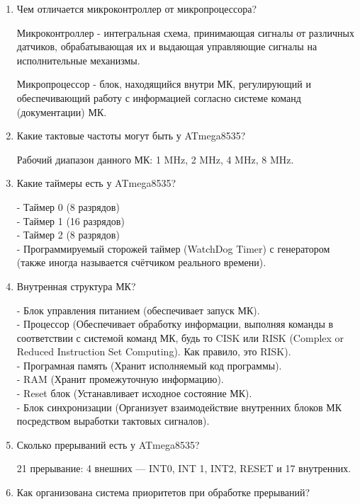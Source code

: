 \documentclass{lab}
\begin{document}

\begin{enumerate}
	\item Чем отличается микроконтроллер от микропроцессора?
	
	Микроконтроллер - интегральная схема, принимающая сигналы от различных датчиков, обрабатывающая их и выдающая управляющие сигналы на исполнительные механизмы.
	
	Микропроцессор - блок, находящийся внутри МК, регулирующий и обеспечивающий работу с информацией согласно системе команд (документации) МК.
	
	\item Какие тактовые частоты могут быть у ATmega8535?
	
	Рабочий диапазон данного МК: 1 MHz, 2 MHz, 4 MHz, 8 MHz.
	
	\item Какие таймеры есть у ATmega8535?
	
	- Таймер 0 (8 разрядов)\\
	- Таймер 1 (16 разрядов)\\
	- Таймер 2 (8 разрядов)\\
	- Программируемый сторожей таймер (WatchDog Timer) с генератором (также иногда называется счётчиком реального времени).
	\item Внутренная структура МК?
	
	- Блок управления питанием (обеспечивает запуск МК).\\
	- Процессор (Обеспечивает обработку информации, выполняя команды в соответствии с системой команд МК, будь то CISK или RISK 
	(Complex or Reduced Instruction Set Computing). Как правило, это RISK).\\
	- Програмная память (Хранит исполняемый код программы).\\
	- RAM (Хранит промежуточную информацию).\\
	- Reset блок (Устанавливает исходное состояние МК).\\
	- Блок синхронизации (Организует взаимодействие внутренних блоков МК посредством выработки тактовых сигналов).
	
	\item Сколько прерываний есть у ATmega8535?
	
	21 прерывание: 4 внешних — INT0, INT 1, INT2, RESET и 17 внутренних.
	
	\item Как организована система приоритетов при обработке прерываний?
	

\end{enumerate}
\end{document}
